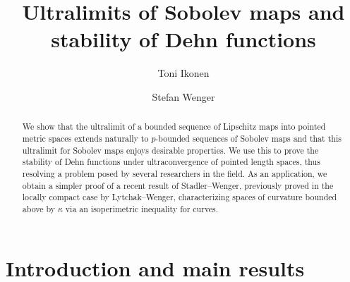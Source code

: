\documentclass[a4paper,leqno]{amsart}
\title{Ultralimits of Sobolev maps and stability of Dehn functions}
\author{Toni Ikonen}
\author{Stefan Wenger}
\numberwithin{equation}{section}
\theoremstyle{remark}
\theoremstyle{remark}
\begin{document}
\begin{abstract}
    We show that the ultralimit of a bounded sequence of Lipschitz maps into pointed metric spaces extends naturally to $p$-bounded sequences of Sobolev maps and that this ultralimit for Sobolev maps enjoys desirable properties. We use this to prove the stability of Dehn functions under ultraconvergence of pointed length spaces, thus resolving a problem posed by several researchers in the field. As an application, we obtain a simpler proof of a recent result of Stadler--Wenger, previously proved in the locally compact case by Lytchak--Wenger, characterizing spaces of curvature bounded above by $\kappa$ via an isoperimetric inequality for curves.
\end{abstract}
\maketitle


\section{Introduction and main results}
\end{document}
